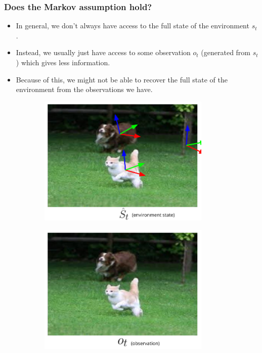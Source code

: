 \begin{frame}
    \frametitle{Does the Markov assumption hold?}
    \begin{itemize}
        \item In general, we don't always have access to the full state
              of the environment $s_{t}$.
        \item Instead, we usually just have access to some observation
              $o_{t}$ (generated from $s_{t}$) which gives less information.
        \item Because of this, we might not be able to recover the full state
              of the environment from the observations we have.
    \end{itemize}

    \pause

    \begin{figure}
        \centering
        \begin{subfigure}{0.3\textwidth}
            \centering
            \includegraphics[width=0.9\textwidth]{./imgs/img_rl_pomdp_example_2.png}
        \end{subfigure}
        \begin{subfigure}{0.3\textwidth}
            \centering
            \includegraphics[width=0.9\textwidth]{./imgs/img_rl_pomdp_example_1.png}

\end{subfigure}
\end{figure}
\end{frame}
